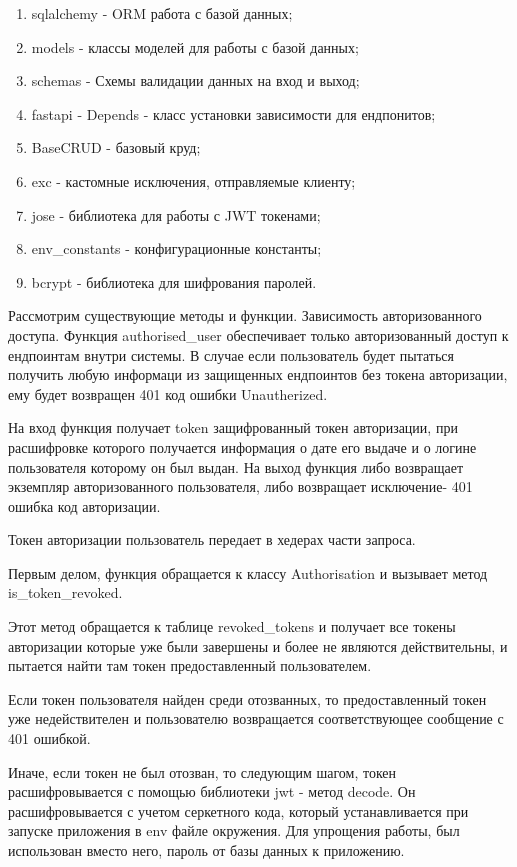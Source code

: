 \documentclass[a4paper,14pt,oneside]{extreport}
\begin{document}
\begin{enumerate}[label=\arabic*)]
    \item sqlalchemy - ORM работа с базой данных;
    \item models - классы моделей для работы с базой данных;
    \item schemas - Схемы валидации данных на вход и выход;
    \item fastapi - Depends - класс установки зависимости для ендпонитов;
    \item BaseCRUD - базовый круд;
    \item exc - кастомные исключения, отправляемые клиенту;
    \item jose - библиотека для работы с JWT токенами;
    \item env\_constants - конфигурационные константы;
    \item bcrypt - библиотека для шифрования паролей.
\end{enumerate}

Рассмотрим существующие методы и функции.  Зависимость авторизованного доступа. Функция authorised\_user обеспечивает только авторизованный доступ к ендпоинтам внутри системы. В случае если пользователь будет пытаться получить любую информаци из защищенных ендпоинтов без токена авторизации, ему будет возвращен 401 код ошибки Unautherized. 

На вход функция получает token защифрованный токен авторизации, при расшифровке которого получается информация о дате его выдаче и о логине пользователя которому он был выдан. 
На выход функция либо возвращает экземпляр авторизованного пользователя, либо возвращает исключение-  401 ошибка код авторизации.

Токен авторизации пользователь передает в хедерах части запроса.

Первым делом, функция обращается к классу Authorisation и вызывает метод is\_token\_revoked.

Этот метод обращается к таблице revoked\_tokens и получает все токены авторизации которые уже были завершены и более не являются действительны, и пытается найти там токен предоставленный пользователем.

Если токен пользователя найден среди отозванных, то предоставленный токен уже недействителен и пользователю возвращается соответствующее сообщение с 401 ошибкой.

Иначе, если токен не был отозван, то следующим шагом, токен расшифровывается с помощью библиотеки jwt - метод decode. Он расшифровывается с учетом серкетного кода, который устанавливается при запуске приложения в env файле окружения. Для упрощения работы, был использован вместо него, пароль от базы данных к приложению.
\end{document}
